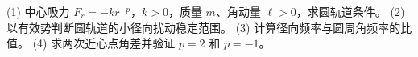 (1) 中心吸力 \(F_r=-kr^{-p}\)，\(k>0\)，质量 \(m\)、角动量 \(\ell>0\)，求圆轨道条件。
(2) 以有效势判断圆轨道的小径向扰动稳定范围。
(3) 计算径向频率与圆周角频率的比值。
(4) 求两次近心点角差并验证 \(p=2\) 和 \(p=-1\)。
